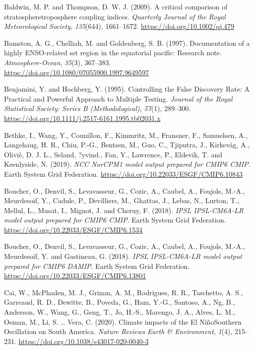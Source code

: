 \documentclass[12pt,oneside,a4paper]{reedthesis}
\newlength{\cslhangindent}
\newenvironment{CSLReferences}[2] %
 {%
  \setlength{\parindent}{0pt}
  \ifodd #1 \everypar{\setlength{\hangindent}{\cslhangindent}}\ignorespaces\fi
  \ifnum #2 > 0
  \setlength{\parskip}{#2\baselineskip}
  \fi
 }%
 {}
\begin{document}
\begin{CSLReferences}{1}{0}
\leavevmode{}%
Baldwin, M. P. and Thompson, D. W. J. (2009). A critical comparison of stratosphere{\textendash}troposphere coupling indices. \emph{Quarterly Journal of the Royal Meteorological Society}, \emph{135}(644), 1661--1672. \url{https://doi.org/10.1002/qj.479}

\leavevmode{}%
Bamston, A. G., Chelliah, M. and Goldenberg, S. B. (1997). Documentation of a highly {ENSO}-related sst region in the equatorial pacific: {Research} note. \emph{Atmosphere-Ocean}, \emph{35}(3), 367--383. \url{https://doi.org/10.1080/07055900.1997.9649597}

\leavevmode{}%
Benjamini, Y. and Hochberg, Y. (1995). Controlling the {False Discovery Rate}: {A Practical} and {Powerful Approach} to {Multiple Testing}. \emph{Journal of the Royal Statistical Society: Series B (Methodological)}, \emph{57}(1), 289--300. \url{https://doi.org/10.1111/j.2517-6161.1995.tb02031.x}

\leavevmode{}%
Bethke, I., Wang, Y., Counillon, F., Kimmritz, M., Fransner, F., Samuelsen, A., Langehaug, H. R., Chiu, P.-G., Bentsen, M., Guo, C., Tjiputra, J., Kirkevåg, A., Oliviè, D. J. L., Seland, ?yvind., Fan, Y., Lawrence, P., Eldevik, T. and Keenlyside, N. (2019). \emph{NCC NorCPM1 model output prepared for CMIP6 CMIP}. Earth System Grid Federation. \url{https://doi.org/10.22033/ESGF/CMIP6.10843}

\leavevmode{}%
Boucher, O., Denvil, S., Levavasseur, G., Cozic, A., Caubel, A., Foujols, M.-A., Meurdesoif, Y., Cadule, P., Devilliers, M., Ghattas, J., Lebas, N., Lurton, T., Mellul, L., Musat, I., Mignot, J. and Cheruy, F. (2018). \emph{IPSL IPSL-CM6A-LR model output prepared for CMIP6 CMIP}. Earth System Grid Federation. \url{https://doi.org/10.22033/ESGF/CMIP6.1534}

\leavevmode{}%
Boucher, O., Denvil, S., Levavasseur, G., Cozic, A., Caubel, A., Foujols, M.-A., Meurdesoif, Y. and Gastineau, G. (2018). \emph{IPSL IPSL-CM6A-LR model output prepared for CMIP6 DAMIP}. Earth System Grid Federation. \url{https://doi.org/10.22033/ESGF/CMIP6.13801}

\leavevmode{}%
Cai, W., McPhaden, M. J., Grimm, A. M., Rodrigues, R. R., Taschetto, A. S., Garreaud, R. D., Dewitte, B., Poveda, G., Ham, Y.-G., Santoso, A., Ng, B., Anderson, W., Wang, G., Geng, T., Jo, H.-S., Marengo, J. A., Alves, L. M., Osman, M., Li, S. \ldots{} Vera, C. (2020). Climate impacts of the {El Ni{ñ}o}{\textendash}{Southern Oscillation} on {South America}. \emph{Nature Reviews Earth \& Environment}, \emph{1}(4), 215--231. \url{https://doi.org/10.1038/s43017-020-0040-3}


\end{CSLReferences}
\end{document}
